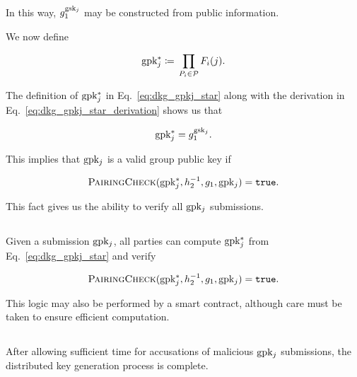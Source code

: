 \noindent
In this way, $g_{1}^{\textrm{gsk}{}_{j}}$ may be constructed from public information.

We now define

\begin{equation}
    \textrm{gpk}{}_{j}^{*} \coloneqq{} \prod_{P_{i}\in\mathcal{P}} F_{i}(j).
    \label{eq:dkg_gpkj_star}
\end{equation}

\noindent
The definition of $\textrm{gpk}{}_{j}^{*}$ in Eq.~\eqref{eq:dkg_gpkj_star}
along with the derivation in Eq.~\eqref{eq:dkg_gpkj_star_derivation}
shows us that

\begin{equation}
    \textrm{gpk}{}_{j}^{*} = g_{1}^{\textrm{gsk}{}_{j}}.
\end{equation}

\noindent
This implies that $\textrm{gpk}{}_{j}$ is a valid group public key if

\begin{equation}
    \textsc{PairingCheck}{}(\textrm{gpk}{}_{j}^{*},h_{2}^{-1},g_{1},\textrm{gpk}{}_{j})
        = \texttt{true}.
\end{equation}

\noindent
This fact gives us the ability to verify all $\textrm{gpk}{}_{j}$ submissions.


\subsection{\GPKDispute{}}
\label{ssec:secret_dkg_gpk_dispute}

Given a submission $\textrm{gpk}{}_{j}$, all parties can compute $\textrm{gpk}{}_{j}^{*}$
from Eq.~\eqref{eq:dkg_gpkj_star} and verify

\begin{equation}
    \textsc{PairingCheck}{}(\textrm{gpk}{}_{j}^{*},h_{2}^{-1},g_{1},\textrm{gpk}{}_{j})
        = \texttt{true}.
\end{equation}

\noindent
This logic may also be performed by a \gls{smart contract},
although care must be taken to ensure efficient computation.


\subsection{\Completion{}}
\label{ssec:secret_dkg_completion}

After allowing sufficient time for accusations of malicious
$\textrm{gpk}{}_{j}$ submissions,
the \gls{distributed key generation} process is complete.
